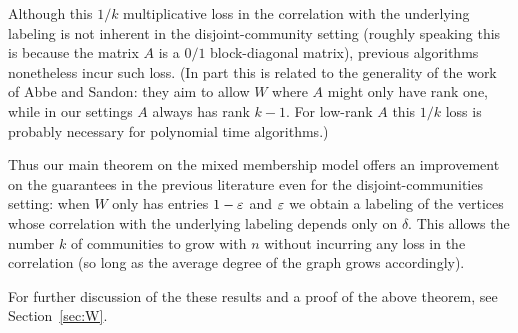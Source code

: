 Although this $1/k$ multiplicative loss in the correlation with the underlying labeling is not inherent in the disjoint-community setting (roughly speaking this is because the matrix $A$ is a $0/1$ block-diagonal matrix), previous algorithms nonetheless incur such loss.
(In part this is related to the generality of the work of Abbe and Sandon: they aim to allow $W$ where $A$ might only have rank one, while in our settings $A$ always has rank $k-1$. For low-rank $A$ this $1/k$ loss is probably necessary for polynomial time algorithms.)

Thus our main theorem on the mixed membership model offers an improvement on the guarantees in the previous literature even for the disjoint-communities setting: when $W$ only has entries $1-\varepsilon$ and $\varepsilon$ we obtain a labeling of the vertices whose correlation with the underlying labeling depends only on $\delta$.
This allows the number $k$ of communities to grow with $n$ without incurring any loss in the correlation (so long as the average degree of the graph grows accordingly).

For further discussion of the these results and a proof of the above theorem, see Section~\ref{sec:W}.

\iffalse
This condition is called the Kesten--Stigum threshold and is exactly the threshold achieved by previous best polynomial-time algorithms\footnote{Here, achieving the Kesten--Stigum threshold means that if $\e^2 d /k^2 - 1 >0$ is lower bounded by any constant, then the algorithm achieves constant correlation with the true community structure (for a notion of correlation similar to \cref{eq:mixed-membership-correlation}).} (due to \cite{DBLP:conf/stoc/Massoulie14,DBLP:conf/stoc/MosselNS15} for $k=2$ and \cite{DBLP:conf/nips/AbbeS16} for general $k$).
For $k=2$, our notion of correlation \cref{eq:mixed-membership-correlation} is equivalent to the ones in previous works \cite{DBLP:conf/stoc/Massoulie14,DBLP:conf/stoc/MosselNS15}.
For general $k$, though, our notion of correlation is stronger.
Previous algorithms output a single vector $\tilde y\in \R^n$ such that $\iprod{Y_\sigma \Ind_S,\tilde y}\ge \delta'\cdot \norm{Y_\sigma\Ind_S}\cdot \norm{\tilde y}$ for a subset $S \subseteq [k]$ of communities.\footnote{
  Algorithms in previous works typically output subsets of vertices as opposed to vectors in $\R^n$.
  For disjoint communities, there is little difference between the two.
  In particular, if we have a set of vectors $L$, we can convert it to a set of $L'$ of $0/1$ vectors by a randomized algorithm such that $\E_{L'} \corr(\sigma,L')\ge \Omega(1)\cdot\corr(\sigma,L)^{O(1)}$.
}
The idea is that $y$ corresponds to a single community or a union of up to $k-1$ communities.
The difference between these notions of correlation can be a multiplicative factor of $k$.
\Dnote{}
\fi

